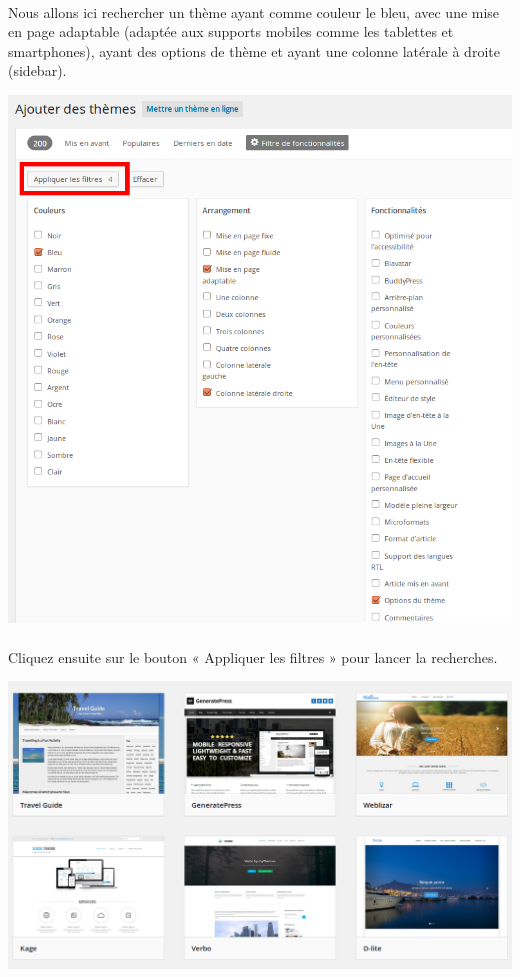 \documentclass[10pt,a4paper]{article}
\begin{document}
\paragraph{}Nous allons ici rechercher un thème ayant comme couleur le bleu, avec une mise en page adaptable (adaptée aux supports mobiles comme les tablettes et smartphones), ayant des options de thème et ayant une colonne latérale à droite (sidebar).
\begin{center}
\includegraphics[scale=0.3]{img/0241.png}
\end{center}
\paragraph{}Cliquez ensuite sur le bouton « Appliquer les filtres » pour lancer la recherches.
\begin{center}
\includegraphics[scale=0.3]{img/0242.png}
\end{center}
\newpage
\end{document}
